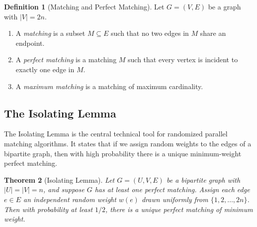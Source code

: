 \documentclass[twoside,12pt]{book}
\theoremstyle{plain}
\newtheorem{theorem}{Theorem}[chapter]
\theoremstyle{definition}
\newtheorem{definition}[theorem]{Definition}
\theoremstyle{remark}
\begin{document}
\begin{definition}[Matching and Perfect Matching]
\label{def:matching}
Let $G = (V, E)$ be a graph with $|V| = 2n$.
\begin{enumerate}[label=(\roman*)]
\item A \emph{matching} is a subset $M \subseteq E$ such that no two edges in $M$ share an endpoint.
\item A \emph{perfect matching} is a matching $M$ such that every vertex is incident to exactly one edge in $M$.
\item A \emph{maximum matching} is a matching of maximum cardinality.
\end{enumerate}
\end{definition}

\subsection{The Isolating Lemma}
\label{subsec:isolating-lemma}

The Isolating Lemma is the central technical tool for randomized parallel matching algorithms. It states that if we assign random weights to the edges of a bipartite graph, then with high probability there is a unique minimum-weight perfect matching.

\begin{theorem}[Isolating Lemma]
\label{thm:isolating}
Let $G = (U, V, E)$ be a bipartite graph with $|U| = |V| = n$, and suppose $G$ has at least one perfect matching. Assign each edge $e \in E$ an independent random weight $w(e)$ drawn uniformly from $\{1, 2, \ldots, 2n\}$. Then with probability at least $1/2$, there is a unique perfect matching of minimum weight.
\end{theorem}
\end{document}

